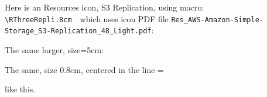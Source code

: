 \documentclass[12pt]{article}
\newcommand{\vcenteredinclude}[1]{\begingroup
\setbox0=\hbox{#1}%
\parbox{\wd0}{\box0}\endgroup}
\begin{document}



\vspace{3cm}

Here is an Resources icon, S3 Replication, using macro: \texttt{{\textbackslash}RThreeRepli{.8cm}}\ \  which uses icon PDF file \texttt{Res\_AWS-Amazon-Simple-Storage\_S3-Replication\_48\_Light.pdf}:
\RSThreeRepli{.8cm}

\vspace{2cm}
The same larger, size=5cm: \RSThreeRepli{5cm}

\vspace{1cm}
The same, size 0.8cm, centered in the line \vcenteredinclude{\RSThreeRepli{.8cm}} like this.
\end{document}
